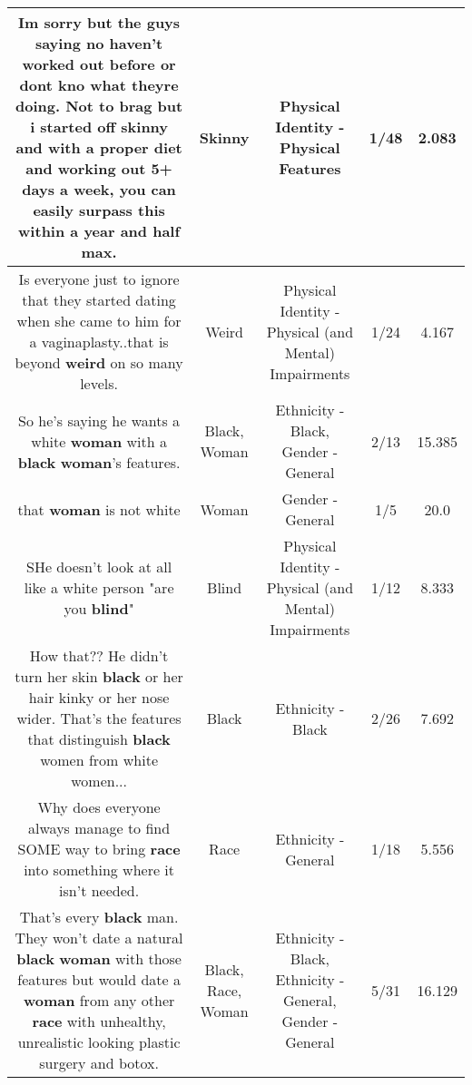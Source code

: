 \documentclass[11pt]{article}
\newlength\mylength
\begin{document}
\begin{center}
\begin{longtable}{|C{.65\mylength}|C{.30\mylength}|C{.12\mylength}|C{.12\mylength}|C{.12\mylength}|}
  \small Im sorry but the guys saying no haven't worked out before or dont kno what theyre doing. Not to brag but i started off \textbf{skinny} and with a proper diet and working out 5+ days a week, you can easily surpass this within a year and half max.\normalsize   & Skinny & Physical Identity - Physical Features & 1/48 & 2.083 \\  \hline
  \small Is everyone just to ignore that they started dating when she came to him for a vaginaplasty..that is beyond \textbf{weird} on so many levels.\normalsize   & Weird & Physical Identity - Physical (and Mental) Impairments & 1/24 & 4.167 \\  \hline
  \small So he's saying he wants a white \textbf{woman} with a \textbf{black} \textbf{woman}'s features.\normalsize   & Black, Woman & Ethnicity - Black, Gender - General & 2/13 & 15.385 \\  \hline
  \small that \textbf{woman} is not white\normalsize   & Woman & Gender - General & 1/5 & 20.0 \\  \hline
  \small SHe doesn't look at all like a white person "are you \textbf{blind}"\normalsize   & Blind & Physical Identity - Physical (and Mental) Impairments & 1/12 & 8.333 \\  \hline
  \small How that?? He didn't turn her skin \textbf{black} or her hair kinky or her nose wider. That's the features that distinguish \textbf{black} women from white women...\normalsize   & Black & Ethnicity - Black & 2/26 & 7.692 \\  \hline
  \small Why does everyone always manage to find SOME way to bring \textbf{race} into something where it isn't needed.\normalsize   & Race & Ethnicity - General & 1/18 & 5.556 \\  \hline
  \small That's every \textbf{black} man. They won't date a natural \textbf{black} \textbf{woman} with those features but would date a \textbf{woman} from any other \textbf{race} with unhealthy, unrealistic looking plastic surgery and botox.\normalsize   & Black, Race, Woman & Ethnicity - Black, Ethnicity - General, Gender - General & 5/31 & 16.129 \\  \hline

\end{longtable}
\end{center}
\end{document}
